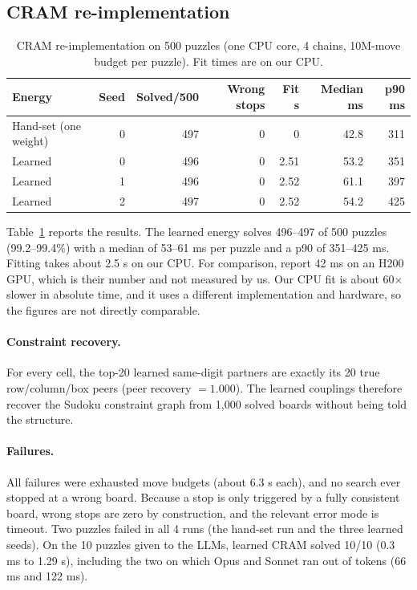 \documentclass{article} %
\begin{document}
\subsection{CRAM re-implementation}
\begin{table}[t]
\centering
\caption{CRAM re-implementation on 500 puzzles (one CPU core, 4 chains, 10M-move budget per puzzle). Fit times are on our CPU.}
\label{tab:cram}
\small
\begin{tabular}{lrrrrrr}
\toprule
Energy & Seed & Solved/500 & Wrong stops & Fit s & Median ms & p90 ms \\
\midrule
Hand-set (one weight) & 0 & 497 & 0 & 0 & 42.8 & 311 \\
Learned & 0 & 496 & 0 & 2.51 & 53.2 & 351 \\
Learned & 1 & 496 & 0 & 2.52 & 61.1 & 397 \\
Learned & 2 & 497 & 0 & 2.52 & 54.2 & 425 \\
\bottomrule
\end{tabular}
\end{table}

Table~\ref{tab:cram} reports the results. The learned energy solves 496--497 of 500 puzzles (99.2--99.4\%) with a median of 53--61 ms per puzzle and a p90 of 351--425 ms. Fitting takes about 2.5 s on our CPU. For comparison, \citet{hoover2026cram} report 42 ms on an H200 GPU, which is their number and not measured by us. Our CPU fit is about 60$\times$ slower in absolute time, and it uses a different implementation and hardware, so the figures are not directly comparable.

\paragraph{Constraint recovery.}
For every cell, the top-20 learned same-digit partners are exactly its 20 true row/column/box peers (peer recovery $=1.000$). The learned couplings therefore recover the Sudoku constraint graph from 1,000 solved boards without being told the structure.

\paragraph{Failures.}
All failures were exhausted move budgets (about 6.3 s each), and no search ever stopped at a wrong board. Because a stop is only triggered by a fully consistent board, wrong stops are zero by construction, and the relevant error mode is timeout. Two puzzles failed in all 4 runs (the hand-set run and the three learned seeds). On the 10 puzzles given to the LLMs, learned CRAM solved 10/10 (0.3 ms to 1.29 s), including the two on which Opus and Sonnet ran out of tokens (66 ms and 122 ms).
\end{document}
